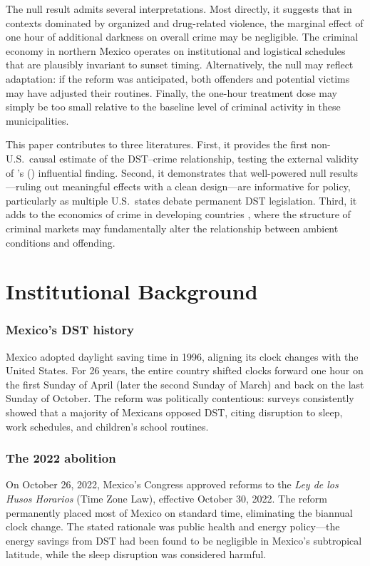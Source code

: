\documentclass[12pt]{article}
\begin{document}
The null result admits several interpretations. Most directly, it suggests that in contexts dominated by organized and drug-related violence, the marginal effect of one hour of additional darkness on overall crime may be negligible. The criminal economy in northern Mexico operates on institutional and logistical schedules that are plausibly invariant to sunset timing. Alternatively, the null may reflect adaptation: if the reform was anticipated, both offenders and potential victims may have adjusted their routines. Finally, the one-hour treatment dose may simply be too small relative to the baseline level of criminal activity in these municipalities.

This paper contributes to three literatures. First, it provides the first non-U.S.\ causal estimate of the DST--crime relationship, testing the external validity of \citeauthor{doleac2015}'s (\citeyear{doleac2015}) influential finding. Second, it demonstrates that well-powered null results---ruling out meaningful effects with a clean design---are informative for policy, particularly as multiple U.S.\ states debate permanent DST legislation. Third, it adds to the economics of crime in developing countries \citep{fajnzylber2002, di2004, blattman2017}, where the structure of criminal markets may fundamentally alter the relationship between ambient conditions and offending.

\section{Institutional Background}

\subsubsection*{Mexico's DST history} Mexico adopted daylight saving time in 1996, aligning its clock changes with the United States. For 26 years, the entire country shifted clocks forward one hour on the first Sunday of April (later the second Sunday of March) and back on the last Sunday of October. The reform was politically contentious: surveys consistently showed that a majority of Mexicans opposed DST, citing disruption to sleep, work schedules, and children's school routines.

\subsubsection*{The 2022 abolition} On October 26, 2022, Mexico's Congress approved reforms to the \textit{Ley de los Husos Horarios} (Time Zone Law), effective October 30, 2022. The reform permanently placed most of Mexico on standard time, eliminating the biannual clock change. The stated rationale was public health and energy policy---the energy savings from DST had been found to be negligible in Mexico's subtropical latitude, while the sleep disruption was considered harmful.
\end{document}
